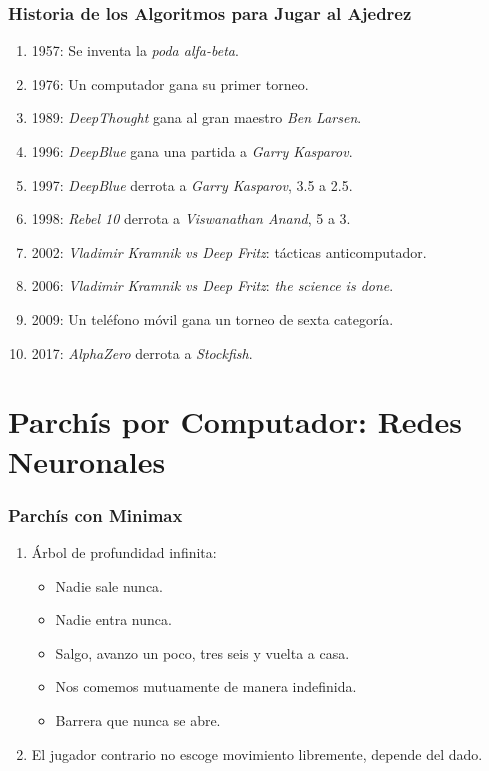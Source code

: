 \documentclass[a4paper,t,xcolor=pst,dvips,colortheme]{beamer}
\begin{document}
\begin{frame}[c]
    \frametitle{Historia de los Algoritmos para Jugar al Ajedrez}
    \begin{enumerate}[<+->]
        \item 1957: Se inventa la \emph{poda alfa-beta}.
        \item 1976: Un computador gana su primer torneo.
        \item 1989: \emph{DeepThought} gana al gran maestro \emph{Ben Larsen}.
        \item 1996: \emph{DeepBlue} gana una partida a \emph{Garry Kasparov}.
        \item 1997: \emph{DeepBlue} derrota a \emph{Garry Kasparov}, 3.5 a 2.5.
        \item 1998: \emph{Rebel 10} derrota a \emph{Viswanathan Anand}, 5 a 3.
        \item 2002: \emph{Vladimir Kramnik vs Deep Fritz}: tácticas anticomputador.
        \item 2006: \emph{Vladimir Kramnik vs Deep Fritz}: \emph{the science is done}.
        \item 2009: Un teléfono móvil gana un torneo de sexta categoría.
        \item 2017: \emph{AlphaZero} derrota a \emph{Stockfish}.
    \end{enumerate}
\end{frame}

\section{Parchís por Computador: Redes Neuronales}

\begin{frame}[c]
    \frametitle{Parchís con Minimax}
    \begin{enumerate}[<+->]
        \item Árbol de profundidad infinita:
        \begin{itemize}
            \item Nadie sale nunca. 
            \item Nadie entra nunca.
            \item Salgo, avanzo un poco, tres seis y vuelta a casa.
            \item Nos comemos mutuamente de manera indefinida.
            \item Barrera que nunca se abre.
        \end{itemize}
        \item El jugador contrario no escoge movimiento libremente, depende del dado.
    \end{enumerate}
\end{frame}



\end{document}
